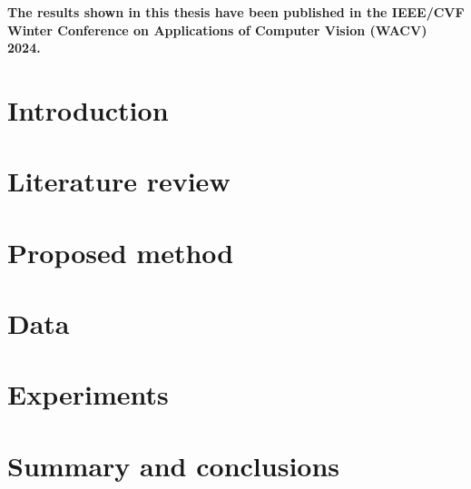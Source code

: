 \documentclass[12pt, oneside, a4paper]{book}
\begin{document}


{   
    \noindent
    \textbf{The results shown in this thesis have been published in the IEEE/CVF Winter Conference on Applications of Computer Vision (WACV) 2024.}
}



\cleardoublepage
{}

{
    \hypersetup{linkcolor=black}
    \tableofcontents
    \cleardoublepage
    \listoftables
    \cleardoublepage
    \listoffigures
    \cleardoublepage
}

\chapter{Introduction}
\label{sec:introduction}


\chapter{Literature review}
\label{sec:literature_review}


\chapter{Proposed method}
\label{sec:methods}


\chapter{Data}
\label{sec:data}


\chapter{Experiments}
\label{sec:experiments}


\chapter{Summary and conclusions}
\label{sec:conclusions}


\cleardoublepage
{\small


}
\end{document}

